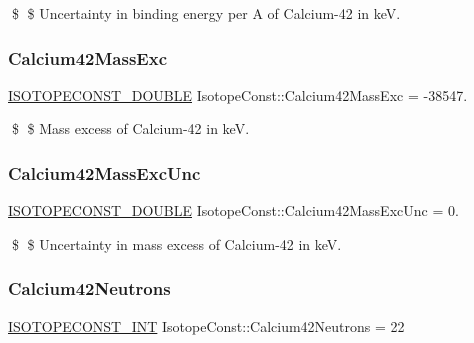 \$ \$ Uncertainty in binding energy per A of Calcium-\/42 in keV. \mbox{\label{group___isotope_const-_calcium-_ca42_ga15e978c03942844bdb8bec8f425c116f}} 
\subsubsection{\texorpdfstring{Calcium42\+Mass\+Exc}{Calcium42MassExc}}
{\footnotesize\ttfamily \mbox{\hyperlink{group___isotope_const-_macros_ga8f45a7272ce02c0b4c65c44636ed719a}{I\+S\+O\+T\+O\+P\+E\+C\+O\+N\+S\+T\+\_\+\+D\+O\+U\+B\+LE}} Isotope\+Const\+::\+Calcium42\+Mass\+Exc = -\/38547.}

\$ \$ Mass excess of Calcium-\/42 in keV. \mbox{\label{group___isotope_const-_calcium-_ca42_ga231c3a2558032e1eef67d8486ebeaaa7}} 
\subsubsection{\texorpdfstring{Calcium42\+Mass\+Exc\+Unc}{Calcium42MassExcUnc}}
{\footnotesize\ttfamily \mbox{\hyperlink{group___isotope_const-_macros_ga8f45a7272ce02c0b4c65c44636ed719a}{I\+S\+O\+T\+O\+P\+E\+C\+O\+N\+S\+T\+\_\+\+D\+O\+U\+B\+LE}} Isotope\+Const\+::\+Calcium42\+Mass\+Exc\+Unc = 0.}

\$ \$ Uncertainty in mass excess of Calcium-\/42 in keV. \mbox{\label{group___isotope_const-_calcium-_ca42_ga208fbe1d3806f305ab544478224f7ac1}} 
\subsubsection{\texorpdfstring{Calcium42\+Neutrons}{Calcium42Neutrons}}
{\footnotesize\ttfamily \mbox{\hyperlink{group___isotope_const-_macros_ga5f18360b3e99483a35c32d789e62621c}{I\+S\+O\+T\+O\+P\+E\+C\+O\+N\+S\+T\+\_\+\+I\+NT}} Isotope\+Const\+::\+Calcium42\+Neutrons = 22}

